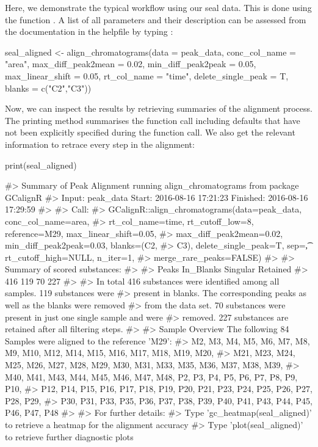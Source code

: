 Here, we demonstrate the typical workflow using our seal data. This is
done using the function . A list of all
parameters and their description can be assessed from the documentation
in the helpfile by typing :

\begin{Schunk}
\begin{Sinput}
seal_aligned <- align_chromatograms(data = peak_data,
                    conc_col_name = "area",
                    max_diff_peak2mean = 0.02,
                    min_diff_peak2peak = 0.05,
                    max_linear_shift = 0.05,
                    rt_col_name = "time",
                    delete_single_peak = T,
                    blanks = c("C2","C3"))
\end{Sinput}
\end{Schunk}

Now, we can inspect the results by retrieving summaries of the alignment
process. The printing method summarises the function call including
defaults that have not been explicitly specified during the function
call. We also get the relevant information to retrace every step in the
alignment:

\begin{Schunk}
\begin{Sinput}
print(seal_aligned)
\end{Sinput}
\begin{Soutput}
#>   Summary of Peak Alignment running align_chromatograms from package GCalignR
#>   Input: peak_data   Start:  2016-08-16 17:21:23     Finished:  2016-08-16 17:29:59 
#> 
#> Call:
#>   GCalignR::align_chromatograms(data=peak_data, conc_col_name=area,
#>   rt_col_name=time, rt_cutoff_low=8, reference=M29, max_linear_shift=0.05,
#>   max_diff_peak2mean=0.02, min_diff_peak2peak=0.03, blanks=(C2,
#>   C3), delete_single_peak=T, sep=\t, rt_cutoff_high=NULL, n_iter=1,
#>   merge_rare_peaks=FALSE)
#> 
#> Summary of scored substances:
#> 
#>     Peaks In_Blanks  Singular  Retained 
#>       416       119        70       227 
#> 
#>   In total 416 substances were identified among all samples. 119 substances were
#>   present in blanks. The corresponding peaks as well as the blanks were removed
#>   from the data set. 70 substances were present in just one single sample and were
#>   removed. 227 substances are retained after all filtering steps.
#> 
#> Sample Overview  The following 84 Samples were aligned to the reference 'M29':
#>   M2, M3, M4, M5, M6, M7, M8, M9, M10, M12, M14, M15, M16, M17, M18, M19, M20,
#>   M21, M23, M24, M25, M26, M27, M28, M29, M30, M31, M33, M35, M36, M37, M38, M39,
#>   M40, M41, M43, M44, M45, M46, M47, M48, P2, P3, P4, P5, P6, P7, P8, P9, P10,
#>   P12, P14, P15, P16, P17, P18, P19, P20, P21, P23, P24, P25, P26, P27, P28, P29,
#>   P30, P31, P33, P35, P36, P37, P38, P39, P40, P41, P43, P44, P45, P46, P47, P48
#> 
#> For further details:
#>   Type 'gc_heatmap(seal_aligned)' to retrieve a heatmap for the alignment accuracy
#>   Type 'plot(seal_aligned)' to retrieve further diagnostic plots
\end{Soutput}
\end{Schunk}

